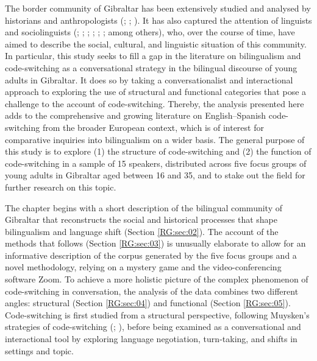 \documentclass[output=paper]{langscibook}
\begin{document}
The border community of Gibraltar has been extensively studied and analysed by historians and anthropologists (\citealt{lopez_de_ayala_historia_1782}; \citealt{gold_gibraltar_2005}; \citealt{grocott_gibraltar_2012}). It has also captured the attention of linguists and sociolinguists 
(\citealt{lipski_sobre_1986}; \citealt{moyer_bilingual_1998}; \citeyear{moyer_pieter_2002}; \citealt{kellermann_new_2001}; \citealt{levey_language_2008}; \citealt{loureiro-porto_language_2017}; among others), who, over the course of time, have aimed to describe the social, cultural, and linguistic situation of this community. In particular, this study seeks to fill a gap in the literature on bilingualism and code-switching as a conversational strategy in the bilingual discourse of young adults in Gibraltar. It does so by taking a conversationalist and interactional approach to exploring the use of structural and functional categories that pose a challenge to the account of code-switching. Thereby, the analysis presented here adds to the comprehensive and growing literature on English–Spanish code-switching from the broader European context, which is of interest for comparative inquiries into bilingualism on a wider basis. The general purpose of this study is to explore (1) the structure of code-switching and (2) the function of code-switching in a sample of 15 speakers, distributed across five focus groups of young adults in Gibraltar aged between 16 and 35, and to stake out the field for further research on this topic.

\newpage
The chapter begins with a short description of the bilingual community of Gibraltar that reconstructs the social and historical processes that shape bilingualism and language shift (Section \ref{RG:sec:02}). The account of the methods that follows (Section \ref{RG:sec:03}) is unusually elaborate to allow for an informative description of the corpus generated by the five focus groups and a novel methodology, relying on a mystery game and the video-conferencing software Zoom. To achieve a more holistic picture of the complex phenomenon of code-switching in conversation, the analysis of the data combines two different angles: structural (Section \ref{RG:sec:04}) and functional (Section \ref{RG:sec:05}). Code-switching is first studied from a structural perspective, following Muysken’s strategies of code-switching (\citealt{muysken_bilingual_2000}; \citeyear{muysken_language_2013}), before being examined as a conversational and interactional tool by exploring language negotiation, turn-taking, and shifts in settings and topic.
\end{document}
